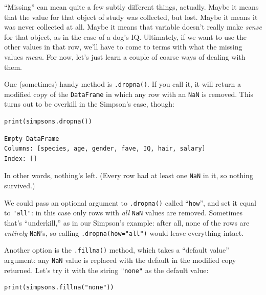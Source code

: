 
``Missing'' can mean quite a few subtly different things, actually. Maybe it
means that the value for that object of study was collected, but lost. Maybe it
means it was never collected at all. Maybe it means that variable doesn't
really make \textit{sense} for that object, as in the case of a dog's IQ.
Ultimately, if we want to use the other values in that row, we'll have to come
to terms with what the missing values \textit{mean}. For now, let's just learn
a couple of coarse ways of dealing with them.


One (sometimes) handy method is \texttt{.dropna()}. If you call it, it will
return a modified copy of the \texttt{DataFrame} in which any row with an
\texttt{NaN} is removed. This turns out to be overkill in the Simpson's case,
though:

\begin{Verbatim}[fontsize=\small,samepage=true,frame=single,framesep=3mm]
print(simpsons.dropna())
\end{Verbatim}
\vspace{-.2in}

\begin{Verbatim}[fontsize=\small,samepage=true,frame=leftline,framesep=5mm,framerule=1mm]
Empty DataFrame
Columns: [species, age, gender, fave, IQ, hair, salary]
Index: []
\end{Verbatim}

In other words, nothing's left. (Every row had at least one \texttt{NaN} in
it, so nothing survived.)

We could pass an optional argument to \texttt{.dropna()} called
``\texttt{how}'', and set it equal to \texttt{"all"}: in this case only rows
with \textit{all} \texttt{NaN} values are removed. Sometimes that's
``underkill,'' as in our Simpson's example: after all, none of the rows are
\textit{entirely} \texttt{NaN}'s, so calling \texttt{.dropna(how="all")}
would leave everything intact.


Another option is the \texttt{.fillna()} method, which takes a ``default
value'' argument: any \texttt{NaN} value is replaced with the default in the
modified copy returned. Let's try it with the string \texttt{"none"} as the
default value:

\begin{Verbatim}[fontsize=\small,samepage=true,frame=single,framesep=3mm]
print(simpsons.fillna("none"))
\end{Verbatim}
\vspace{-.2in}

